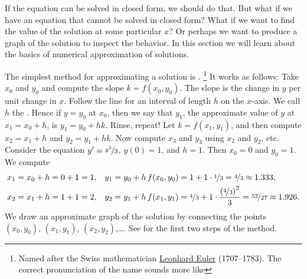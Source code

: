 If the equation can be solved in closed form, we should do that.
But what if we have an equation that cannot be solved in closed form?
What if we want to find the value of the solution at some particular $x$?
Or perhaps we want to produce a graph of the solution to inspect the
behavior.  In this section we will learn about the basics of numerical
approximation of solutions.

The simplest method for approximating a solution is
\emph{}.%
\footnote{Named after the Swiss mathematician
\href{https://en.wikipedia.org/wiki/Leonhard_Euler}{Leonhard Euler}
(1707--1783).  The correct pronunciation of the name sounds more
like }
It works as follows:
Take $x_0$ and $y_0$ and compute the slope $k = f(x_0,y_0)$.  The slope is the
change in $y$ per unit change in $x$.  Follow the line for an interval of
length $h$ on the $x$-axis.
We call $h$ the \emph{}.
Hence if $y = y_0$ at $x_0$, then we say that
$y_1$, the approximate value of $y$ at $x_1 = x_0 + h$, is
$y_1 = y_0 + h k$.
Rinse, repeat!  Let $k = f(x_1,y_1)$, and then compute
$x_2 = x_1 + h$ and $y_2 = y_1 + h k$.
Now compute $x_3$ and $y_3$ using $x_2$ and $y_2$, etc.
Consider the equation $y' = \nicefrac{y^2}{3}$, $y(0)=1$, and $h=1$.
Then $x_0=0$ and $y_0 = 1$.  We compute
\begin{align*}
& x_1 = x_0 + h = 0 + 1 = 1, & & y_1 = y_0 + h \, f(x_0,y_0) = 1 + 1 \cdot
\nicefrac{1}{3} = \nicefrac{4}{3} \approx 1.333,\\
& x_2 = x_1 + h = 1 + 1 = 2, & & y_2 = y_1 + h \, f(x_1,y_1) =
\nicefrac{4}{3} + 1 \cdot \frac{{(\nicefrac{4}{3})}^2}{3} =
\nicefrac{52}{27} \approx 1.926.
\end{align*}
We draw an approximate graph of the solution by
connecting the points
$(x_0,y_0)$,
$(x_1,y_1)$,
$(x_2,y_2)$,\dots.
See 
for the first two steps of the method.

\begin{myfig}
\capstart
\caption{First two steps of Euler's method with $h=1$ for
the equation $y' = \frac{y^2}{3}$ with initial condition $y(0)=1$.%
\label{euler-step12:fig}}
\end{myfig}

